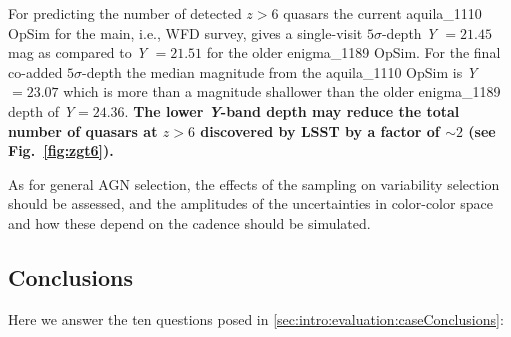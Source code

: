For predicting the number of detected $z>6$ quasars
the current
aquila\_{}1110 OpSim for the main, i.e., WFD survey, gives a
single-visit $5\sigma$-depth
{\it Y} $= 21.45$ mag as compared to {\it Y} $= 21.51$ for the older enigma\_{}1189 OpSim.
For the final co-added $5\sigma$-depth the median magnitude from the aquila\_{}1110
OpSim is
{\it Y}$ = 23.07$ which is more than a magnitude shallower than the older enigma\_{}1189
depth of {\it Y}$ = 24.36$.
{\bf The lower {\it Y}-band depth may reduce the total number of quasars at $z > 6$ discovered by LSST by
a factor of $\sim 2$
(see Fig.~\ref{fig:zgt6}).}



As for general AGN selection, the effects of the sampling on variability selection
should be assessed, and the amplitudes of the uncertainties in color-color space
and how these depend on the cadence should be simulated.

%
%
%
%

\subsection{Conclusions}

Here we answer the ten questions posed in
\autoref{sec:intro:evaluation:caseConclusions}:


